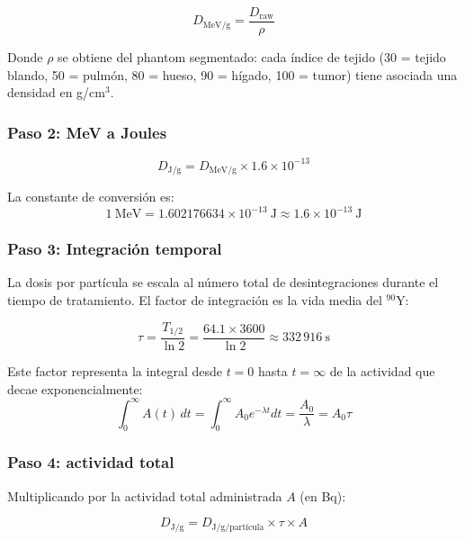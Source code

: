 \documentclass[12pt,a4paper]{article}
\begin{document}
\begin{equation}
    D_{\text{MeV/g}} = \frac{D_{\text{raw}}}{\rho}
\end{equation}

Donde $\rho$ se obtiene del phantom segmentado: cada índice de tejido
(30 = tejido blando, 50 = pulmón, 80 = hueso, 90 = hígado, 100 = tumor)
tiene asociada una densidad en g/cm$^3$.

\subsubsection{Paso 2: MeV a Joules}

\begin{equation}
    D_{\text{J/g}} = D_{\text{MeV/g}} \times 1.6 \times 10^{-13}
\end{equation}

La constante de conversión es:
\begin{equation}
    1\ \text{MeV} = 1.602176634 \times 10^{-13}\ \text{J} \approx 1.6 \times 10^{-13}\ \text{J}
\end{equation}

\subsubsection{Paso 3: Integración temporal}

La dosis por partícula se escala al número total de desintegraciones
durante el tiempo de tratamiento. El factor de integración es la vida
media del $^{90}$Y:

\begin{equation}
    \tau = \frac{T_{1/2}}{\ln 2} = \frac{64.1 \times 3600}{\ln 2} \approx 332\,916\ \text{s}
\end{equation}

Este factor representa la integral desde $t=0$ hasta $t=\infty$ de la
actividad que decae exponencialmente:
\begin{equation}
    \int_0^\infty A(t)\,dt = \int_0^\infty A_0 e^{-\lambda t} dt = \frac{A_0}{\lambda} = A_0 \tau
\end{equation}

\subsubsection{Paso 4: actividad total}

Multiplicando por la actividad total administrada $A$ (en Bq):

\begin{equation}
    D_{\text{J/g}} = D_{\text{J/g/partícula}} \times \tau \times A
\end{equation}
\end{document}

